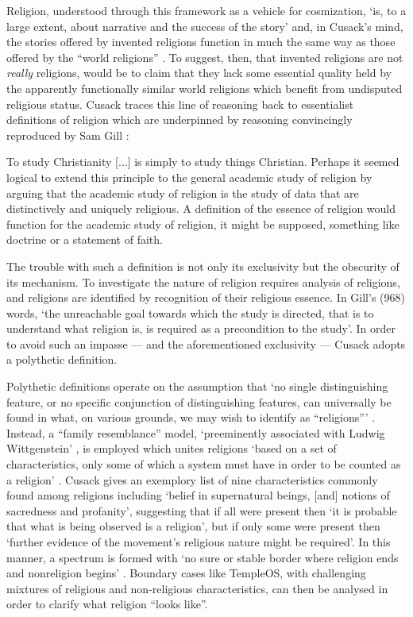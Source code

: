 Religion, understood through this framework as a vehicle for cosmization,
`is, to a large extent, about narrative and the success of the story'
and, in Cusack's mind,
the stories offered by invented religions function in much the same way
as those offered by the ``world religions'' \parencite[4]{Cusack10}.
To suggest, then, that invented religions are not \textit{really} religions,
would be to claim that they lack some essential quality held by
the apparently functionally similar world religions
which benefit from undisputed religious status.
Cusack traces this line of reasoning back to essentialist definitions
of religion which are underpinned by reasoning convincingly
reproduced by Sam Gill \parencite*[968]{Gill94}:
\begin{displayquote}
  To study Christianity [...] is simply to study things Christian.
  Perhaps it seemed logical to extend this principle to the general
  academic study of religion by arguing that the academic study of religion
  is the study of data that are distinctively and uniquely religious.
  A definition of the essence of religion would function for the academic
  study of religion, it might be supposed, something like doctrine or a
  statement of faith.
\end{displayquote}
The trouble with such a definition is not only its exclusivity but the
obscurity of its mechanism.
To investigate the nature of religion requires analysis of religions,
and religions are identified by recognition of their religious essence.
In Gill's (968) words, `the unreachable goal towards which the study
is directed, that is to understand what religion is,
is required as a precondition to the study'.
In order to avoid such an impasse --- and the aforementioned exclusivity ---
Cusack adopts a polythetic definition.

Polythetic definitions operate on the assumption that
`no single distinguishing feature, or no specific conjunction
of distinguishing features, can universally be found in what,
on various grounds, we may wish to identify as ``religions''\thinspace'
\parencite[158]{Saler93}.
Instead, a ``family resemblance'' model, `preeminently associated with
Ludwig Wittgenstein' \parencite[159]{Saler93}, is employed which unites
religions `based on a set of characteristics, only some of which a system
must have in order to be counted as a religion' \parencite[158]{Wilson98}.
Cusack \parencite*[20]{Cusack10} gives an exemplory list
of nine characteristics commonly found among religions including
`belief in supernatural beings, [and] notions of sacredness and profanity',
suggesting that if all were present then `it is probable that what is being
observed is a religion', but if only some were present then `further
evidence of the movement's religious nature might be required'.
In this manner, a spectrum is formed with
`no sure or stable border where religion ends and
nonreligion begins' \parencite[396]{Saler99}.
Boundary cases like TempleOS, with challenging mixtures of
religious and non-religious characteristics, can then be analysed in order
to clarify what religion ``looks like''.

